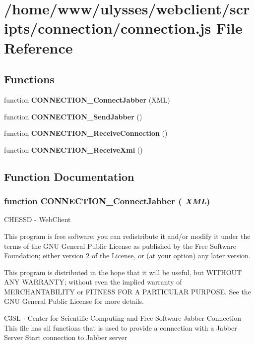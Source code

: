\section{/home/www/ulysses/webclient/scripts/connection/connection.js File Reference}
\label{connection_8js}
\subsection*{Functions}
\begin{CompactItemize}
\item 
function {\bf CONNECTION\_\-ConnectJabber} (XML)
\item 
function {\bf CONNECTION\_\-SendJabber} ()
\item 
function {\bf CONNECTION\_\-ReceiveConnection} ()
\item 
function {\bf CONNECTION\_\-ReceiveXml} ()
\end{CompactItemize}


\subsection{Function Documentation}
\subsubsection{\setlength{\rightskip}{0pt plus 5cm}function CONNECTION\_\-ConnectJabber ( {\em XML})}\label{connection_8js_9b036fe22f76456fd31719fe29034d7b}


CHESSD - WebClient

This program is free software; you can redistribute it and/or modify it under the terms of the GNU General Public License as published by the Free Software Foundation; either version 2 of the License, or (at your option) any later version.

This program is distributed in the hope that it will be useful, but WITHOUT ANY WARRANTY; without even the implied warranty of MERCHANTABILITY or FITNESS FOR A PARTICULAR PURPOSE. See the GNU General Public License for more details.

C3SL - Center for Scientific Computing and Free Software Jabber Connection This file has all functions that is used to provide a connection with a Jabber Server Start connection to Jabber server

